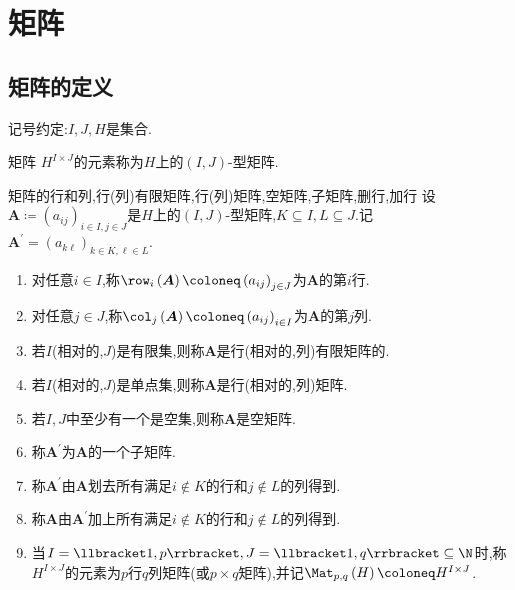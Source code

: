 \chapter{矩阵}

\section{矩阵的定义}

记号约定:$I,J,H$是集合.

\begin{definition}{矩阵}{}
	$H^{I\times J}$的元素称为$H$上的$\left(I,J\right)$-型矩阵.
\end{definition}

\begin{definition}{矩阵的行和列,行(列)有限矩阵,行(列)矩阵,空矩阵,子矩阵,删行,加行}{}
	设$\boldsymbol{A}\coloneq\left(a_{ij}\right)_{i\in I,j\in J}$是$H$上的$\left(I,J\right)$-型矩阵,$K\subseteq I,L\subseteq J$.记$\boldsymbol{A}^{\prime}=\left(a_{k\ell}\right)_{k\in K,\ell\in L}$.
	\begin{enumerate}
		\item 对任意$i\in I$,称$\row_{i}\left(\boldsymbol{A}\right)\coloneq\left(a_{ij}\right)_{j\in J}$为$\boldsymbol{A}$的第$i$行.
		\item 对任意$j\in J$,称$\col_{j}\left(\boldsymbol{A}\right)\coloneq\left(a_{ij}\right)_{i\in I}$为$\boldsymbol{A}$的第$j$列.
		\item 若$I$(相对的,$J$)是有限集,则称$\boldsymbol{A}$是行(相对的,列)有限矩阵的.
		\item 若$I$(相对的,$J$)是单点集,则称$\boldsymbol{A}$是行(相对的,列)矩阵.
		\item 若$I,J$中至少有一个是空集,则称$\boldsymbol{A}$是空矩阵.
		\item 称$\boldsymbol{A}^{\prime}$为$\boldsymbol{A}$的一个子矩阵.
		\item 称$\boldsymbol{A}^{\prime}$由$\boldsymbol{A}$划去所有满足$i\notin K$的行和$j\notin L$的列得到.
		\item 称$\boldsymbol{A}$由$\boldsymbol{A}^{\prime}$加上所有满足$i\notin K$的行和$j\notin L$的列得到.
		\item 当$I=\llbracket 1,p\rrbracket,J=\llbracket 1,q\rrbracket\subseteq\N$时,称$H^{I\times J}$的元素为$p$行$q$列矩阵(或$p\times q$矩阵),并记$\Mat_{p,q}\left(H\right)\coloneq H^{I\times J}$.
	\end{enumerate}
\end{definition}

